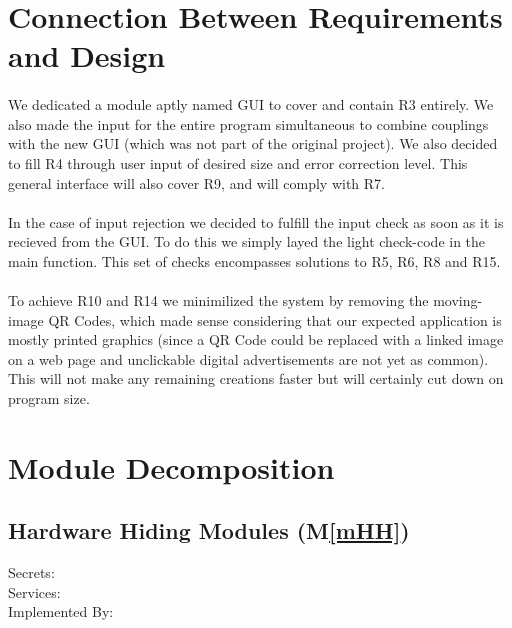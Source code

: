 \documentclass[12pt, titlepage]{article}
\newcommand{\mref}[1]{M\ref{#1}}
\begin{document}
\section{Connection Between Requirements and Design} \label{SecConnection}

\paragraph{}
We dedicated a module aptly named GUI to cover and contain R3 entirely. 
We also made the input for the entire program simultaneous to combine couplings
with the new GUI (which was not part of the original project). We also 
decided to fill R4 through user input of desired size and error correction level.
This general interface will also cover R9, and will comply with R7.

\paragraph{}
In the case of input rejection we decided to fulfill the input check as soon as it is 
recieved from the GUI. To do this we simply layed the light check-code in the main function.
This set of checks encompasses solutions to R5, R6, R8 and R15.

\paragraph{}
To achieve R10 and R14 we minimilized the system by removing the moving-image QR 
Codes, which made sense considering that our expected application is mostly printed 
graphics (since a QR Code could be replaced with a linked image on a web page and 
unclickable digital advertisements are not yet as common). This will not make any 
remaining creations faster but will certainly cut down on program size.

\section{Module Decomposition} \label{SecMD}


\subsection{Hardware Hiding Modules (\mref{mHH})}

\begin{description}
\item[Secrets:]
\item[Services:]
\item[Implemented By:]
\end{description}
\end{document}
